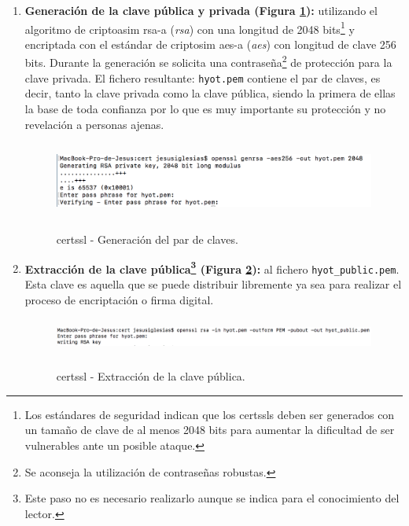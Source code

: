 \documentclass[12pt,a4paper, twoside]{report}
\begin{document}
	\begin{enumerate}
	
		\item \textbf{Generación de la clave pública y privada (Figura \ref{fig:cert_keys}):} utilizando el algoritmo de \gls{criptoasim} \gls{rsa-a} (\textit{\gls{rsa}}) con una longitud de 2048 bits\footnote{Los estándares de seguridad indican que los \glspl{certssl} deben ser generados con un tamaño de clave de al menos 2048 bits para aumentar la dificultad de ser vulnerables ante un posible ataque.} y encriptada con el estándar de \gls{criptosim} \gls{aes-a} (\textit{\gls{aes}}) con longitud de clave 256 bits. Durante la generación se solicita una contraseña\footnote{Se aconseja la utilización de contraseñas robustas.} de protección para la clave privada. El fichero resultante: \texttt{hyot.pem} contiene el par de claves, es decir, tanto la clave privada como la clave pública, siendo la primera de ellas la base de toda confianza por lo que es muy importante su protección y no revelación a personas ajenas.
				 
			\begin{figure}[!ht]   
				\caption{\Gls{certssl} - Generación del par de claves.} 
				\begin{center} 
	 				\includegraphics[width=15cm,height=2.5cm]{Images/installationManual/cert/keys} \\
					\label{fig:cert_keys} 
				\end{center}  
			\end{figure}
		
		\item \textbf{Extracción de la clave pública\footnote{Este paso no es necesario realizarlo aunque se indica para el conocimiento del lector.} (Figura \ref{fig:cert_publickey}):} al fichero \texttt{hyot\_public.pem}. Esta clave es aquella que se puede distribuir libremente ya sea para realizar el proceso de encriptación o firma digital. 
		 
			\begin{figure}[!ht]   
				\caption{\Gls{certssl} - Extracción de la clave pública.} 
				\begin{center} 
	 				\includegraphics[width=18cm,height=1.2cm]{Images/installationManual/cert/key_public.png} \\
					\label{fig:cert_publickey} 
				\end{center}  
			\end{figure}
			

\end{enumerate}
\end{document}
